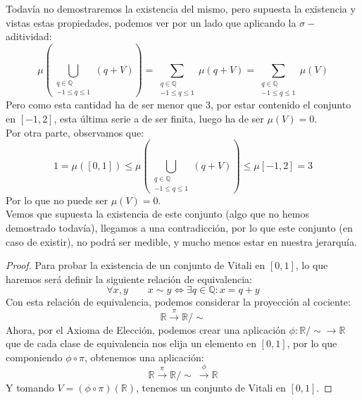 Todavía no demostraremos la existencia del mismo, pero supuesta la existencia y vistas estas propiedades, podemos ver por un lado que aplicando la $\sigma-$aditividad:
\begin{equation*}
    \mu\left(\bigcup\limits_{\substack{q\in \mathbb{Q} \\ -1\leq q \leq 1}} (q+V)\right) = \sum\limits_{\substack{q\in \mathbb{Q}\\-1\leq q \leq 1}}\mu(q+V) = \sum\limits_{\substack{q\in \mathbb{Q}\\-1\leq q \leq 1}}\mu(V)
\end{equation*}
Pero como esta cantidad ha de ser menor que 3, por estar contenido el conjunto en $[-1,2]$, esta última serie a de ser finita, luego ha de ser $\mu(V) = 0$.\\

\noindent
Por otra parte, observamos que:
\begin{equation*}
    1 = \mu([0,1]) \leq \mu\left(\bigcup\limits_{\substack{q\in \mathbb{Q} \\ -1\leq q \leq 1}} (q+V)\right) \leq \mu[-1,2] = 3
\end{equation*}
Por lo que no puede ser $\mu(V) = 0$.\\

Vemos que supuesta la existencia de este conjunto (algo que no hemos demostrado todavía), llegamos a una contradicción, por lo que este conjunto (en caso de existir), no podrá ser medible, y mucho menos estar en nuestra jerarquía.

\begin{proof}
    Para probar la existencia de un conjunto de Vitali en $[0,1]$, lo que haremos será definir la siguiente relación de equivalencia:
    \begin{equation*}
        \forall x,y \qquad x\sim y \Longleftrightarrow \exists q\in \mathbb{Q} : x = q+y
    \end{equation*}
    Con esta relación de equivalencia, podemos considerar la proyección al cociente:
    \begin{equation*}
        \mathbb{R} \stackrel{\pi}{\longrightarrow} \mathbb{R}/\sim
    \end{equation*}
    Ahora, por el Axioma de Elección, podemos crear una aplicación $\phi:\mathbb{R}/\sim \to \mathbb{R}$ que de cada clase de equivalencia nos elija un elemento en $[0,1]$, por lo que componiendo $\phi\circ \pi$, obtenemos una aplicación:
    \begin{equation*}
        \mathbb{R} \stackrel{\pi}{\longrightarrow} \mathbb{R}/\sim\ \stackrel{\phi}{\longrightarrow} \mathbb{R}
    \end{equation*}
    Y tomando $V = (\phi\circ \pi) (\mathbb{R})$, tenemos un conjunto de Vitali en $[0,1]$.
\end{proof}

